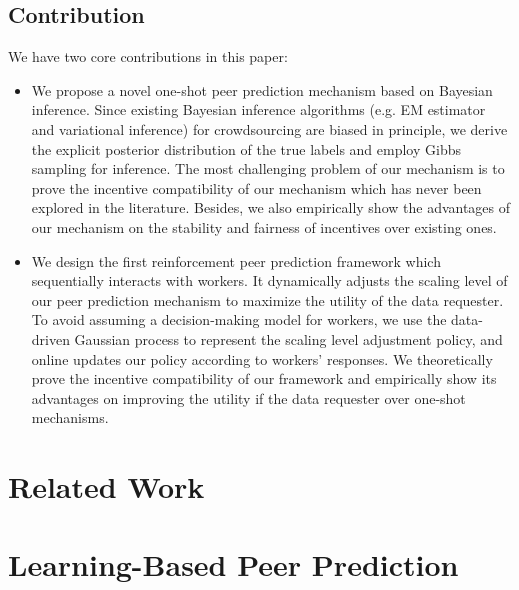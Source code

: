 \documentclass{article}
\begin{document}
\subsection{Contribution}
We have two core contributions in this paper:
\begin{itemize}
\item We propose a novel one-shot peer prediction mechanism based on Bayesian inference. Since existing Bayesian inference algorithms (e.g. EM estimator and variational inference) for crowdsourcing are biased in principle, we derive the explicit posterior distribution of the true labels and employ Gibbs sampling for inference. The most challenging problem of our mechanism is to prove the incentive compatibility of our mechanism which has never been explored in the literature. Besides, we also empirically show the advantages of our mechanism on the stability and fairness of incentives over existing ones.
\item We design the first reinforcement peer prediction framework which sequentially interacts with workers. It dynamically adjusts the scaling level of our peer prediction mechanism to maximize the utility of the data requester. To avoid assuming a decision-making model for workers, we use the data-driven Gaussian process to represent the scaling level adjustment policy, and online updates our policy according to workers' responses. We theoretically prove the incentive compatibility of our framework and empirically show its advantages on improving the utility if the data requester over one-shot mechanisms.
\end{itemize}

\section{Related Work}

\section{Learning-Based Peer Prediction}
\end{document}
